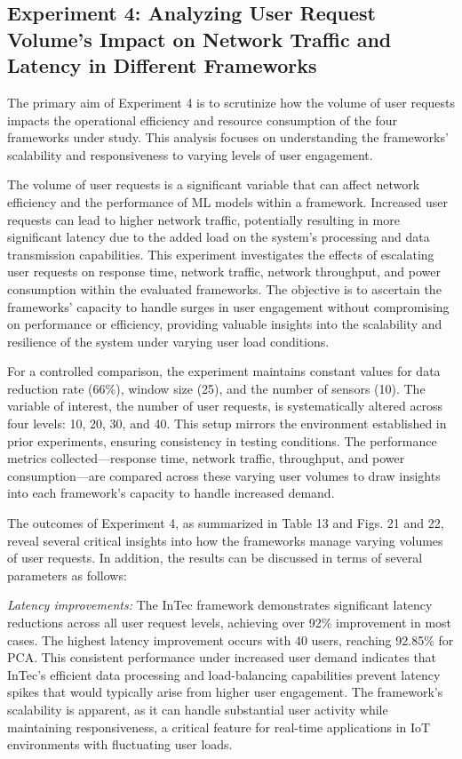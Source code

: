 \documentclass[11pt]{article}
\begin{document}
	\subsection{\textbf{Experiment 4:} Analyzing User Request Volume's Impact on Network Traffic and Latency in Different Frameworks}
	The primary aim of Experiment 4 is to scrutinize how the volume of user requests
	impacts the operational efficiency and resource consumption of the four frameworks
	under study. This analysis focuses on understanding the frameworks’ scalability and
	responsiveness to varying levels of user engagement.
	
	The volume of user requests is a significant variable that can affect network
	efficiency and the performance of ML models within a framework. Increased user
	requests can lead to higher network traffic, potentially resulting in more significant
	latency due to the added load on the system’s processing and data transmission
	capabilities. This experiment investigates the effects of escalating user requests on
	response time, network traffic, network throughput, and power consumption within
	the evaluated frameworks. The objective is to ascertain the frameworks’ capacity to
	handle surges in user engagement without compromising on performance or efficiency, providing valuable insights into the scalability and resilience of the system
	under varying user load conditions.
	
	For a controlled comparison, the experiment maintains constant values for data
	reduction rate (66\%), window size (25), and the number of sensors (10). The variable of interest, the number of user requests, is systematically altered across four
	levels: 10, 20, 30, and 40. This setup mirrors the environment established in prior
	experiments, ensuring consistency in testing conditions. The performance metrics
	collected—response time, network traffic, throughput, and power consumption—are
	compared across these varying user volumes to draw insights into each framework’s
	capacity to handle increased demand.
	
	The outcomes of Experiment 4, as summarized in Table 13 and Figs. 21 and 22,
	reveal several critical insights into how the frameworks manage varying volumes of
	user requests. In addition, the results can be discussed in terms of several parameters
	as follows:
	
	\textit{Latency improvements:} The InTec framework demonstrates significant latency
	reductions across all user request levels, achieving over 92\% improvement in most
	cases. The highest latency improvement occurs with 40 users, reaching 92.85\%
	for PCA. This consistent performance under increased user demand indicates that
	InTec’s efficient data processing and load-balancing capabilities prevent latency
	spikes that would typically arise from higher user engagement. The framework’s
	scalability is apparent, as it can handle substantial user activity while maintaining
	responsiveness, a critical feature for real-time applications in IoT environments with
	fluctuating user loads.
	
\end{document}

